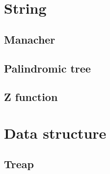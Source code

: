 \section{String}
\subsection{Manacher}
\raggedbottom
\hrulefill
\subsection{Palindromic tree}
\raggedbottom
\hrulefill
\subsection{Z function}
\raggedbottom
\hrulefill

\section{Data structure}
\subsection{Treap}
\raggedbottom
\hrulefill

